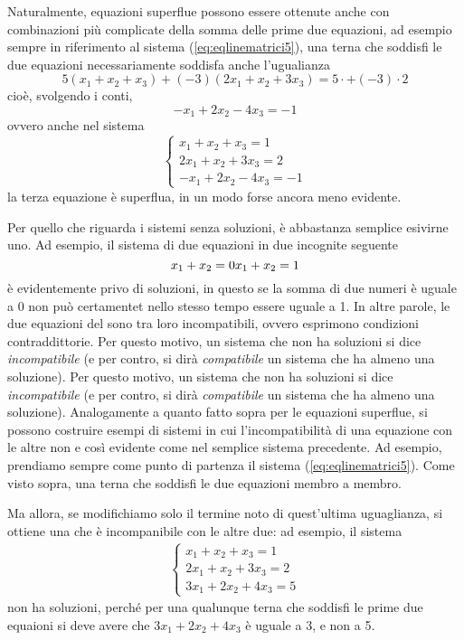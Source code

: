 \begin{defi}
  Naturalmente, equazioni superflue possono essere ottenute anche con
  combinazioni più complicate della somma delle prime due equazioni, ad
  esempio sempre in riferimento al sistema (\ref{eq:eqlinematrici5}), una
  terna che soddisfi le due equazioni necessariamente soddisfa anche
  l'ugualianza
  \begin{equation}
    \label{eq:eqlinematrici7}
    5(x_1+x_2+x_3)+(-3)(2x_1+x_2+3x_3)=5\cdot +(-3)\cdot 2
  \end{equation}
  cioè, svolgendo i conti,
  \begin{equation*}
    -x_1+2x_2-4x_3=-1
  \end{equation*}
  ovvero anche nel sistema
  \begin{equation}
    \label{eq:eqlinematrici8}
    \begin{cases}
      x_1+x_2+x_3=1\\
      2x_1+x_2+3x_3=2\\
      -x_1+2x_2-4x_3=-1
    \end{cases}
  \end{equation}
  la terza equazione è superflua, in un modo forse ancora meno evidente.

  Per quello che riguarda i sistemi senza soluzioni, è abbastanza semplice
  esivirne uno. Ad esempio, il sistema di due equazioni in due incognite
  seguente
  \begin{equation*}
    x_1+x_2=0\\
    x_1+x_2=1
  \end{equation*}
  è evidentemente privo di soluzioni, in questo se la somma di due numeri
  è uguale a 0 non può certamentet nello stesso tempo essere uguale a 1.
  In altre parole, le due equazioni del sono tra loro incompatibili,
  ovvero esprimono condizioni contraddittorie.
  Per questo motivo, un sistema che non ha soluzioni si dice
  \textit{incompatibile} (e per contro, si dirà \textit{compatibile} un
  sistema che ha almeno una soluzione).
  Per questo motivo, un sistema che non ha soluzioni si dice
  \textit{incompatibile} (e per contro, si dirà \textit{compatibile} un
  sistema che ha almeno una soluzione).
  Analogamente a quanto fatto sopra per le equazioni superflue, si possono
  costruire esempi di sistemi in cui l'incompatibilità di una equazione
  con le altre non e così evidente come nel semplice sistema precedente.
  Ad esempio, prendiamo sempre come punto di partenza il sistema
  (\ref{eq:eqlinematrici5}). Come visto sopra, una terna che soddisfi le
  due equazioni membro a membro.

  Ma allora, se modifichiamo solo il termine noto di quest'ultima
  uguaglianza, si ottiene una che è incompanibile con le altre due:
  ad esempio, il sistema
  \begin{eqnarray}
    \label{eq:eqlinematrici9}
    \begin{cases}
      x_1+x_2+x_3=1\\
      2x_1+x_2+3x_3=2\\
      3x_1+2x_2+4x_3=5
    \end{cases}
  \end{eqnarray}
  non ha soluzioni, perché per una qualunque terna che soddisfi le prime
  due equaioni si deve avere che $3x_1+2x_2+4x_3$ è uguale a 3, e non a 5.
\end{defi}

